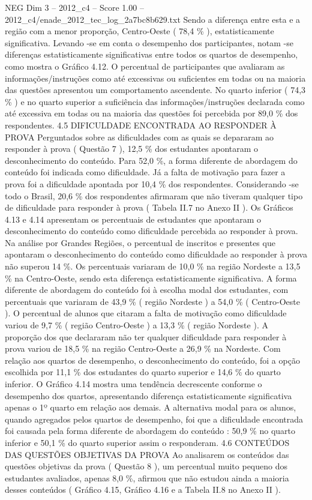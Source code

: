 \begin{textsample}{NEG Dim 3 – 2012\_c4 – Score 1.00 – 2012\_c4/enade\_2012\_tec\_log\_2a7bc8b629.txt}
Sendo a diferença entre esta e a região com a menor proporção, Centro-Oeste ( 78,4 \% ), estatisticamente significativa.
Levando -se em conta o desempenho dos participantes, notam -se diferenças estatisticamente significativas entre todos os quartos de desempenho, como mostra o Gráfico 4.12.
O percentual de participantes que avaliaram as informações/instruções como até excessivas ou suficientes em todas ou na maioria das questões apresentou um comportamento ascendente.
No quarto inferior ( 74,3 \% ) e no quarto superior a suficiência das informações/instruções declarada como até excessiva em todas ou na maioria das questões foi percebida por 89,0 \% dos respondentes. 4.5 DIFICULDADE ENCONTRADA AO RESPONDER À PROVA Perguntados sobre as dificuldades com as quais se depararam ao responder à prova ( Questão 7 ), 12,5 \% dos estudantes apontaram o desconhecimento do conteúdo.
Para 52,0 \%, a forma diferente de abordagem do conteúdo foi indicada como dificuldade.
Já a falta de motivação para fazer a prova foi a dificuldade apontada por 10,4 \% dos respondentes.
Considerando -se todo o Brasil, 20,6 \% dos respondentes afirmaram que não tiveram qualquer tipo de dificuldade para responder à prova ( Tabela II.7 no Anexo II ).
Os Gráficos 4.13 e 4.14 apresentam os percentuais de estudantes que apontaram o desconhecimento do conteúdo como dificuldade percebida ao responder à prova.
Na análise por Grandes Regiões, o percentual de inscritos e presentes que apontaram o desconhecimento do conteúdo como dificuldade ao responder à prova não superou 14 \%.
Os percentuais variaram de 10,0 \% na região Nordeste a 13,5 \% na Centro-Oeste, sendo esta diferença estatisticamente significativa.
A forma diferente de abordagem do conteúdo foi à escolha modal dos estudantes, com percentuais que variaram de 43,9 \% ( região Nordeste ) a 54,0 \% ( Centro-Oeste ).
O percentual de alunos que citaram a falta de motivação como dificuldade variou de 9,7 \% ( região Centro-Oeste ) a 13,3 \% ( região Nordeste ).
A proporção dos que declararam não ter qualquer dificuldade para responder à prova variou de 18,5 \% na região Centro-Oeste a 26,9 \% na Nordeste.
Com relação aos quartos de desempenho, o desconhecimento do conteúdo, foi a opção escolhida por 11,1 \% dos estudantes do quarto superior e 14,6 \% do quarto inferior.
O Gráfico 4.14 mostra uma tendência decrescente conforme o desempenho dos quartos, apresentando diferença estatisticamente significativa apenas o 1º quarto em relação aos demais.
A alternativa modal para os alunos, quando agregados pelos quartos de desempenho, foi que a dificuldade encontrada foi causada pela forma diferente de abordagem do conteúdo : 50,9 \% no quarto inferior e 50,1 \% do quarto superior assim o responderam. 4.6 CONTEÚDOS DAS QUESTÕES OBJETIVAS DA PROVA Ao analisarem os conteúdos das questões objetivas da prova ( Questão 8 ), um percentual muito pequeno dos estudantes avaliados, apenas 8,0 \%, afirmou que não estudou ainda a maioria desses conteúdos ( Gráfico 4.15, Gráfico 4.16 e a Tabela II.8 no Anexo II ).

\end{textsample}
